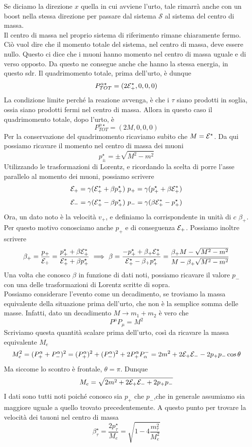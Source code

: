 \documentclass[12pt,twoside,a4]{article}
\begin{document}
\begin{solution}
Se diciamo la direzione $x$ quella in cui avviene l'urto, tale rimarrà  anche con un boost nella stessa direzione per passare dal sistema $\mathcal{S}$ al sistema del centro di massa.
\\
Il centro di massa nel proprio sistema di riferimento rimane chiaramente fermo. Ciò vuol dire che il momento totale del sistema, nel centro di massa, deve essere nullo. Questo ci dice che i muoni hanno momento nel centro di massa uguale e di verso opposto. Da questo ne consegue anche che hanno la stessa energia, in questo sdr. Il quadrimomento totale, prima dell'urto, è dunque
$$ P_{TOT}^{\alpha \star} = (2 \mathcal{E}^\star_+, 0,0,0) $$
La condizione limite perché la reazione avvenga, è che i $\tau$ siano prodotti in soglia, ossia siano prodotti fermi nel centro di massa. Allora in questo caso il quadrimomento totale, dopo l'urto, è
$$ P_{TOT}^{\alpha \star} = (2 M, 0,0,0) $$
Per la conservazione del quadrimomento ricaviamo subito che $M = \mathcal{E}^\star$. Da qui possiamo ricavare il momento nel centro di massa dei muoni
$$ p^\star_\pm = \pm \sqrt{M^2 - m^2}$$
Utilizzando le trasformazioni di Lorentz, e ricordando la scelta di porre l'asse parallelo al momento dei muoni, possiamo scrivere
$$ \mathcal{E}_+ = \gamma (\mathcal{E}^*_+ + \beta p_+^\star)  \  
p_+ = \gamma (p_+^\star + \beta \mathcal{E}^*_+) $$
$$ \mathcal{E}_- = \gamma (\mathcal{E}^*_+ - \beta p_+^\star)  \  
p_- = \gamma ( \beta \mathcal{E}^*_+ - p_+^\star ) $$
Ora, un dato noto è la velocità  $v_+$, e definiamo la corrispondente in unità  di $c$ $\beta_+$. Per questo motivo conosciamo anche $p_+$ e di conseguenza $\mathcal{E}_+$. Possiamo inoltre scrivere
$$ \beta_+ = \frac{p_+}{\mathcal{E}_+} = \frac{p_+^\star + \beta \mathcal{E}^*_+}{\mathcal{E}^*_+ + \beta p_+^\star}  \  \Longrightarrow  \  
\beta = \frac{-p_+^\star + \beta_+ \mathcal{E}_+^\star}{\mathcal{E}_+^\star - \beta_+ p_+^\star} = \frac{\beta_+ M - \sqrt{M^2 -m^2}}{M - \beta_+ \sqrt{M^2 -m^2}}$$
Una volta che conosco $\beta$ in funzione di dati noti, possiamo ricavare il valore $p_-$ con una delle trasformazioni di Lorentz scritte di sopra.
\\
Possiamo considerare l'evento come un decadimento, se troviamo la massa equivalente della situazione prima dell'urto, che non è la semplice somma delle masse. Infatti, dato un decadimento $M \rightarrow m_1 + m_2$ è vero che
$$ P^\mu P_\mu = M^2$$
Scriviamo questa quantità  scalare prima dell'urto, così da ricavare la massa equivalente $M_e$
$$ M^2_e =(P^\alpha_+ + P^\alpha_-)^2 = (P^\alpha_+)^2 + (P^\alpha_-)^2 + 2 P^\alpha_+ P^-_\alpha = 2m^2 + 2\mathcal{E}_+ \mathcal{E}_- -2 p_+ p_- \cos \theta $$ 
Ma siccome lo scontro è frontale, $\theta = \pi$. Dunque
$$ M_e = \sqrt{2m^2 + 2\mathcal{E}_+ \mathcal{E}_- + 2 p_+ p_-}$$
I dati sono tutti noti poiché conosco sia $p_+$ che $p_-$,che in generale assumiamo sia maggiore uguale a quello trovato precedentemente. A questo punto per trovare la velocità  dei tauoni nel centro di massa 
$$\beta_\tau^\star = \frac{2 p^\star_\tau}{M_e} = \sqrt{1 - 4\frac{m_\tau^2}{M_e^2}} $$
\end{solution}
\end{document}
